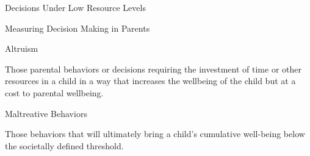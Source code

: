 \documentclass[handout]{beamer}
\begin{document}
\begin{frame}{Decisions Under Low Resource Levels}


\end{frame}

\begin{frame}{Measuring Decision Making in Parents}

\begin{block}{Altruism}

Those parental behaviors or decisions requiring the investment of time
or other resources in a child in a way that increases the wellbeing of
the child but at a cost to parental wellbeing.

\end{block}

\begin{block}{Maltreative Behaviors}

Those behaviors that will ultimately bring a child's cumulative
well-being below the societally defined threshold.

\end{block}

\end{frame}
\end{document}
